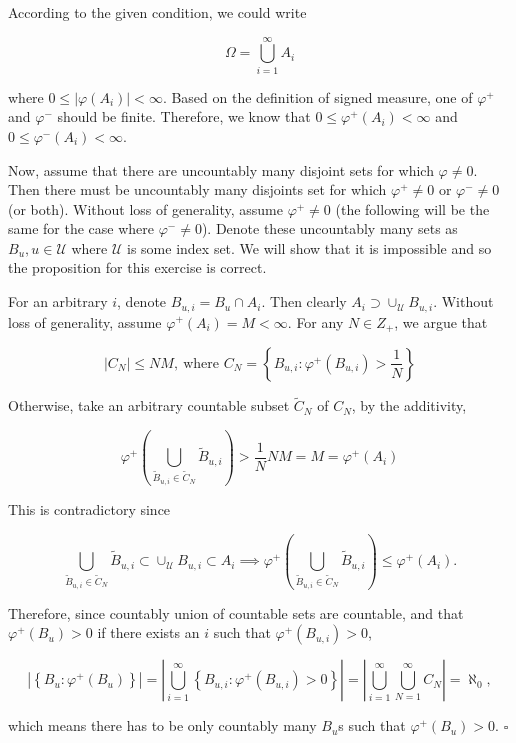 \documentclass[
]{article}
\begin{document}
According to the given condition, we could write

\[\Omega = \bigcup_{i=1}^\infty A_i\]

where \(0 \le \left|\varphi(A_i)\right| < \infty\). Based on the
definition of signed measure, one of \(\varphi^+\) and \(\varphi^-\)
should be finite. Therefore, we know that
\(0 \le \varphi^+(A_i) < \infty\) and \(0 \le \varphi^-(A_i) < \infty\).

Now, assume that there are uncountably many disjoint sets for which
\(\varphi\ne 0\). Then there must be uncountably many disjoints set for
which \(\varphi^+ \ne 0\) or \(\varphi^- \ne 0\) (or both). Without loss
of generality, assume \(\varphi^+ \ne 0\) (the following will be the
same for the case where \(\varphi^- \ne 0\)). Denote these uncountably
many sets as \(B_u, u \in \mathcal U\) where \(\mathcal U\) is some
index set. We will show that it is impossible and so the proposition for
this exercise is correct.

For an arbitrary \(i\), denote \(B_{u,i} = B_u \cap A_i\). Then clearly
\(A_i \supset \cup_{\mathcal U} B_{u, i}\). Without loss of generality,
assume \(\varphi^+(A_i) = M < \infty\). For any \(N \in Z_+\), we argue
that

\[|C_N| \le NM, \ \text{where } C_N = \left\{B_{u, i}: \varphi^+(B_{u,i}) > \frac{1}{N}\right\}\]

Otherwise, take an arbitrary countable subset \(\widetilde C_N\) of
\(C_N\), by the additivity,

\[\varphi^+\left(\bigcup_{\widetilde B_{u, i}\in \widetilde C_N} \widetilde B_{u, i}\right) > \frac{1}{N}NM = M = \varphi^+(A_i)\]

This is contradictory since

\[\bigcup_{\widetilde B_{u, i}\in \widetilde C_N} \widetilde B_{u, i} \subset  \cup_{\mathcal U} B_{u, i} \subset A_i \implies \varphi^+\left(\bigcup_{\widetilde B_{u, i}\in \widetilde C_N} \widetilde B_{u, i}\right) \le \varphi^+(A_i).\]

Therefore, since countably union of countable sets are countable, and
that \(\varphi^+(B_{u}) > 0\) if there exists an \(i\) such that
\(\varphi^+(B_{u, i}) > 0\),

\[\left|\left\{B_u: \varphi^+(B_u) \right\}\right| = \left|\bigcup_{i=1}^\infty\left\{B_{u, i}: \varphi^+(B_{u,i}) > 0\right\}\right| = \left|\bigcup_{i=1}^\infty\bigcup_{N=1}^\infty C_N \right| = \aleph_0,\]

which means there has to be only countably many
\(B_u\)\textquotesingle s such that \(\varphi^+(B_u) >0\). \(\square\)
\end{document}
